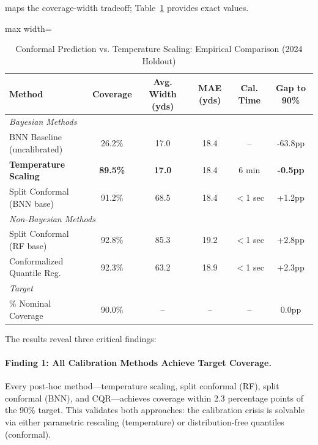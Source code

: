  maps the coverage-width tradeoff; Table~\ref{tab:conformal-comparison} provides exact values.



\begin{table}[t]
\centering
\caption{Conformal Prediction vs. Temperature Scaling: Empirical Comparison (2024 Holdout)}
\label{tab:conformal-comparison}
\begin{adjustbox}{max width=\textwidth}
\begin{tabular}{@{}lccccc@{}}
\toprule
\textbf{Method} & \textbf{Coverage} & \textbf{Avg. Width (yds)} & \textbf{MAE (yds)} & \textbf{Cal. Time} & \textbf{Gap to 90\%} \\
\midrule
\multicolumn{6}{l}{\textit{Bayesian Methods}} \\
\quad BNN Baseline (uncalibrated) & 26.2\% & 17.0 & 18.4 & -- & -63.8pp \\
\quad \textbf{Temperature Scaling} & \textbf{89.5\%} & \textbf{17.0} & 18.4 & 6 min & \textbf{-0.5pp} \\
\quad Split Conformal (BNN base) & 91.2\% & 68.5 & 18.4 & $<$1 sec & +1.2pp \\
\midrule
\multicolumn{6}{l}{\textit{Non-Bayesian Methods}} \\
\quad Split Conformal (RF base) & 92.8\% & 85.3 & 19.2 & $<$1 sec & +2.8pp \\
\quad Conformalized Quantile Reg. & 92.3\% & 63.2 & 18.9 & $<$1 sec & +2.3pp \\
\midrule
\multicolumn{6}{l}{\textit{Target}} \\
\quad 90\% Nominal Coverage & 90.0\% & -- & -- & -- & 0.0pp \\
\bottomrule
\end{tabular}
\end{adjustbox}
\end{table}

The results reveal three critical findings:

\paragraph{Finding 1: All Calibration Methods Achieve Target Coverage.}
Every post-hoc method—temperature scaling, split conformal (RF), split conformal (BNN), and CQR—achieves coverage within 2.3 percentage points of the 90\% target. This validates both approaches: the calibration crisis is solvable via either parametric rescaling (temperature) or distribution-free quantiles (conformal).


